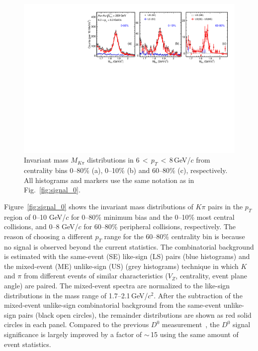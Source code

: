 \documentclass[%
 reprint,	
showpacs,
 amsmath,amssymb,
 aps,
 prc,
]{revtex4-1}
\providecommand{\DIFaddtex}[1]{{\protect\color{blue}\uwave{#1}}} %
\providecommand{\DIFdeltex}[1]{{\protect\color{red}\sout{#1}}}                      %
\providecommand{\DIFaddbegin}{} %
\providecommand{\DIFaddend}{} %
\providecommand{\DIFdelbegin}{} %
\providecommand{\DIFdelend}{} %
\providecommand{\DIFadd}[1]{\texorpdfstring{\DIFaddtex{#1}}{#1}} %
\providecommand{\DIFdel}[1]{\texorpdfstring{\DIFdeltex{#1}}{}} %
\begin{document}
\begin{figure}
\centering
\includegraphics[width=1.0\textwidth]{fig/signal_6_8GeV.pdf}
\caption{Invariant mass $M_{K\pi}$ distributions in 6\,$<$\,$p_{T}$\,$<$\,8\,GeV/$c$ from centrality bins 0--80\% (a), 0--10\% (b) and 60--80\% (c), respectively. All histograms and markers use the same notation as in Fig.~\ref{fig:signal_0}.}
\label{fig:signal_2} 
\end{figure}

Figure~\ref{fig:signal_0} shows the invariant mass distributions of $K\pi$ pairs in the $p_{T}$ region of 0--10 GeV/$c$ for 0--80\% minimum bias and the 0--10\% most central collisions, and 0--8 GeV/$c$ for 60--80\% peripheral collisions, respectively. The reason of choosing a different $p_T$ range for the 60--80\% centrality bin is because no signal is observed beyond the current statistics. The combinatorial background is estimated with the same-event (SE) like-sign (LS) pairs (blue histograms) and the mixed-event (ME) unlike-sign (US) (grey histograms) technique in which $K$ and $\pi$ from different events of similar characteristics ($V_{Z}$, centrality, event plane angle) are paired. The mixed-event spectra are normalized to the like-sign distributions in the mass range of 1.7--2.1\,GeV/$c^2$. After the subtraction of the mixed-event unlike-sign combinatorial background from the same-event unlike-sign pairs (black open circles), the remainder distributions are shown as red solid circles in each panel. Compared to the previous $D^0$ measurement~\cite{Star_D_RAA}, the $D^0$ signal significance is largely improved by a factor of \DIFdelbegin \DIFdel{$\sim$}\DIFdelend \DIFaddbegin \DIFadd{$\approx$}\DIFaddend \,15 using the same amount of event statistics. 
\end{document}
